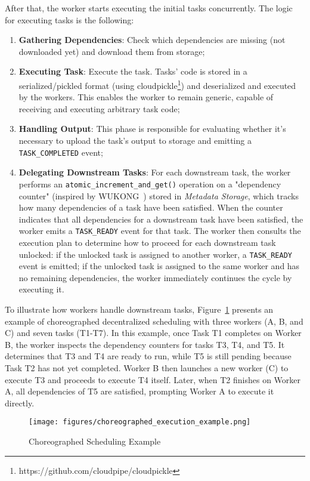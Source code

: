 \documentclass[conference]{IEEEtran}
\begin{document}
After that, the worker starts executing the initial tasks concurrently. The logic for executing tasks is the following:
\begin{enumerate}
    \item \textbf{Gathering Dependencies}: Check which dependencies are missing (not downloaded yet) and download them from storage;
    \item \textbf{Executing Task}: Execute the task. Tasks' code is stored in a serialized/pickled format (using cloudpickle\footnote{https://github.com/cloudpipe/cloudpickle}) and deserialized and executed by the workers. This enables the worker to remain generic, capable of receiving and executing arbitrary task code;
    \item \textbf{Handling Output}: This phase is responsible for evaluating whether it's necessary to upload the task's output to storage and emitting a \texttt{TASK\_COMPLETED} event;
    \item \textbf{Delegating Downstream Tasks}: For each downstream task, the worker performs an \texttt{atomic\_increment\_and\_get()} operation on a "dependency counter" (inspired by WUKONG~\cite{wukong_2}) stored in \textit{Metadata Storage}, which tracks how many dependencies of a task have been satisfied. When the counter indicates that all dependencies for a downstream task have been satisfied, the worker emits a \texttt{TASK\_READY} event for that task. The worker then consults the execution plan to determine how to proceed for each downstream task unlocked: if the unlocked task is assigned to another worker, a \texttt{TASK\_READY} event is emitted; if the unlocked task is assigned to the same worker and has no remaining dependencies, the worker immediately continues the cycle by executing it.
\end{enumerate}

To illustrate how workers handle downstream tasks, Figure~\ref{fig:choreographed_scheduling_example} presents an example of choreographed decentralized scheduling with three workers (A, B, and C) and seven tasks (T1-T7). In this example, once Task T1 completes on Worker B, the worker inspects the dependency counters for tasks T3, T4, and T5. It determines that T3 and T4 are ready to run, while T5 is still pending because Task T2 has not yet completed. Worker B then launches a new worker (C) to execute T3 and proceeds to execute T4 itself. Later, when T2 finishes on Worker A, all dependencies of T5 are satisfied, prompting Worker A to execute it directly.

\begin{figure}[h]
    \centering
    \texttt{[image: figures/choreographed\_execution\_example.png]}
    \caption{Choreographed Scheduling Example}
    \label{fig:choreographed_scheduling_example}
\end{figure}
\end{document}
